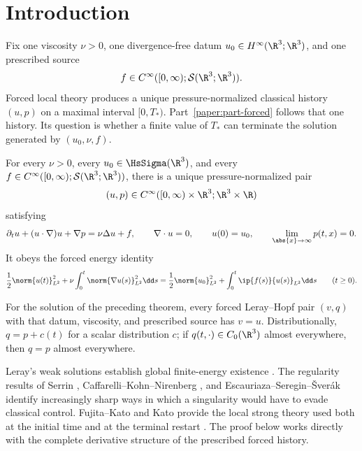 \section{Introduction}
\label{f:sec:introduction}

Fix one viscosity \(\nu>0\), one divergence-free datum
\(u_0\in H^\infty(\R^3;\R^3)\), and one prescribed source
\[
 f\in C^\infty([0,\infty);\mathcal S(\R^3;\R^3)).
\]
Forced local theory produces a unique pressure-normalized classical history
\((u,p)\) on a maximal interval \([0,T_*)\). Part~\ref{paper:part-forced} follows that one
history. Its question is whether a finite value of \(T_*\) can terminate the
solution generated by \((u_0,\nu,f)\).

\begin{maintheorem}
\label{f:thm:main-global}
For every \(\nu>0\), every \(u_0\in\HsSigma(\R^3)\), and every
\(f\in C^\infty([0,\infty);\mathcal S(\R^3;\R^3))\), there is a unique
pressure-normalized pair
\[
 (u,p)\in C^\infty([0,\infty)\times\R^3;\R^3\times\R)
\]
satisfying
\[
 \partial_tu+(u\cdot\nabla)u+\nabla p=\nu\Delta u+f,
 \qquad \nabla\cdot u=0,
 \qquad u(0)=u_0,
 \qquad \lim_{\abs{x}\to\infty}p(t,x)=0.
\]
It obeys the forced energy identity
\[
 \frac12\norm{u(t)}_{L^2}^2
 +\nu\int_0^t\norm{\nabla u(s)}_{L^2}^2\dd s
 =\frac12\norm{u_0}_{L^2}^2
 +\int_0^t\ip{f(s)}{u(s)}_{L^2}\dd s
 \qquad(t\ge0).
\]
\end{maintheorem}

\begin{corollary}
\label{f:cor:main-weak-strong}
For the solution of the preceding theorem, every forced Leray--Hopf pair
\((v,q)\) with that datum, viscosity, and
prescribed source has \(v=u\). Distributionally,
\(q=p+c(t)\) for a scalar distribution \(c\); if
\(q(t,\cdot)\in C_0(\R^3)\) almost everywhere, then \(q=p\) almost
everywhere.
\end{corollary}

Leray's weak solutions establish global finite-energy existence
\cite{Leray1934}. The regularity results of Serrin
\cite{Serrin1962}, Caffarelli--Kohn--Nirenberg \cite{CKN1982}, and
Escauriaza--Seregin--\v{S}ver\'ak \cite{ESS2003} identify increasingly sharp
ways in which a singularity would have to evade classical control.
Fujita--Kato and Kato provide the local strong theory used both at the
initial time and at the terminal restart \cite{FujitaKato1964,Kato1984}.
The proof below works directly with the complete derivative structure of the
prescribed forced history.

